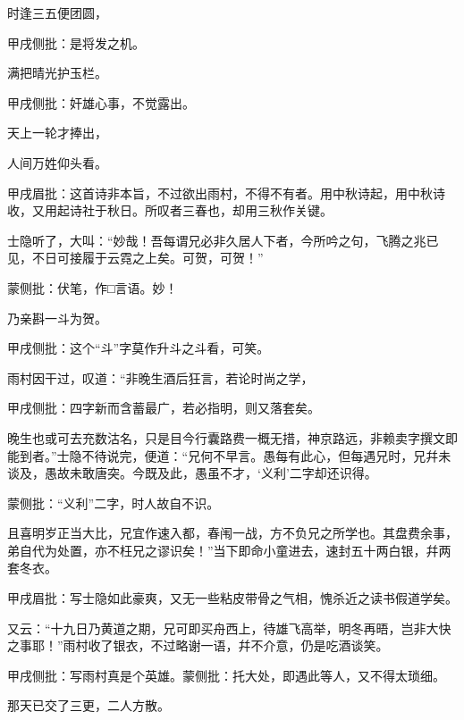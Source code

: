 \begin{poem}

    \begin{pl}
        时逢三五便团圆，\end{pl}\begin{note}甲戌侧批：是将发之机。\end{note}
    \begin{pl}
        满把晴光护玉栏。\end{pl}\begin{note}甲戌侧批：奸雄心事，不觉露出。\end{note}
    \begin{pl}
        天上一轮才捧出，\end{pl}
    \begin{pl}
        人间万姓仰头看。\end{pl}\begin{note}甲戌眉批：这首诗非本旨，不过欲出雨村，不得不有者。用中秋诗起，用中秋诗收，又用起诗社于秋日。所叹者三春也，却用三秋作关键。\end{note}
\end{poem}

\begin{parag}
    士隐听了，大叫：“妙哉！吾每谓兄必非久居人下者，今所吟之句，飞腾之兆已见，不日可接履于云霓之上矣。可贺，可贺！”\begin{note}蒙侧批：伏笔，作□言语。妙！\end{note}乃亲斟一斗为贺。\begin{note}甲戌侧批：这个“斗”字莫作升斗之斗看，可笑。\end{note}雨村因干过，叹道：“非晚生酒后狂言，若论时尚之学，\begin{note}甲戌侧批：四字新而含蓄最广，若必指明，则又落套矣。\end{note}晚生也或可去充数沽名，只是目今行囊路费一概无措，神京路远，非赖卖字撰文即能到者。”士隐不待说完，便道：“兄何不早言。愚每有此心，但每遇兄时，兄幷未谈及，愚故未敢唐突。今既及此，愚虽不才，‘义利’二字却还识得。\begin{note}蒙侧批：“义利”二字，时人故自不识。\end{note}且喜明岁正当大比，兄宜作速入都，春闱一战，方不负兄之所学也。其盘费余事，弟自代为处置，亦不枉兄之谬识矣！”当下即命小童进去，速封五十两白银，幷两套冬衣。\begin{note}甲戌眉批：写士隐如此豪爽，又无一些粘皮带骨之气相，愧杀近之读书假道学矣。\end{note}又云：“十九日乃黄道之期，兄可即买舟西上，待雄飞高举，明冬再晤，岂非大快之事耶！”雨村收了银衣，不过略谢一语，幷不介意，仍是吃酒谈笑。\begin{note}甲戌侧批：写雨村真是个英雄。蒙侧批：托大处，即遇此等人，又不得太琐细。\end{note}那天已交了三更，二人方散。
\end{parag}


